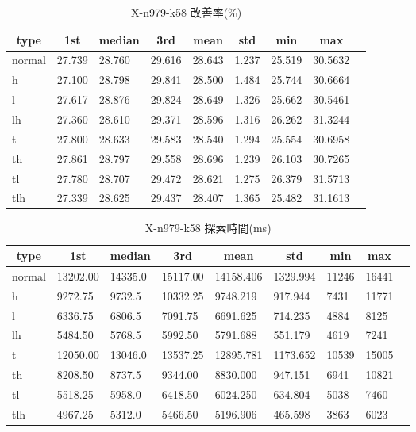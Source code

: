 \begin{table}[htbp]
    \caption{X-n979-k58 改善率(\%)}
    \begin{tabular}{|l|l|l|l|l|l|l|l|l|}\hline
    \multicolumn{1}{|c|}{\textbf{type}}
    &\multicolumn{1}{|c|}{\textbf{1st}}
    &\multicolumn{1}{c|}{\textbf{median}}
    &\multicolumn{1}{c|}{\textbf{3rd}}
    &\multicolumn{1}{c|}{\textbf{mean}}
    &\multicolumn{1}{c|}{\textbf{std}}
    &\multicolumn{1}{c|}{\textbf{min}}
    &\multicolumn{1}{c|}{\textbf{max}}\\\hline
	normal & 27.739 & 28.760 & 29.616 & 28.643 & 1.237 & 25.519 & 30.5632\\\hline
	h & 27.100 & 28.798 & 29.841 & 28.500 & 1.484 & 25.744 & 30.6664\\\hline
	l & 27.617 & 28.876 & 29.824 & 28.649 & 1.326 & 25.662 & 30.5461\\\hline
	lh & 27.360 & 28.610 & 29.371 & 28.596 & 1.316 & 26.262 & 31.3244\\\hline
	t & 27.800 & 28.633 & 29.583 & 28.540 & 1.294 & 25.554 & 30.6958\\\hline
	th & 27.861 & 28.797 & 29.558 & 28.696 & 1.239 & 26.103 & 30.7265\\\hline
	tl & 27.780 & 28.707 & 29.472 & 28.621 & 1.275 & 26.379 & 31.5713\\\hline
	tlh & 27.339 & 28.625 & 29.437 & 28.407 & 1.365 & 25.482 & 31.1613\\\hline
	\end{tabular}
\end{table}
\begin{table}[htbp]
    \caption{X-n979-k58 探索時間(ms)}
    \begin{tabular}{|l|l|l|l|l|l|l|l|l|}\hline
    \multicolumn{1}{|c|}{\textbf{type}}
    &\multicolumn{1}{|c|}{\textbf{1st}}
    &\multicolumn{1}{c|}{\textbf{median}}
    &\multicolumn{1}{c|}{\textbf{3rd}}
    &\multicolumn{1}{c|}{\textbf{mean}}
    &\multicolumn{1}{c|}{\textbf{std}}
    &\multicolumn{1}{c|}{\textbf{min}}
    &\multicolumn{1}{c|}{\textbf{max}}\\\hline
	normal & 13202.00 & 14335.0 & 15117.00 & 14158.406 & 1329.994 & 11246 & 16441\\\hline
	h & 9272.75 & 9732.5 & 10332.25 & 9748.219 & 917.944 & 7431 & 11771\\\hline
	l & 6336.75 & 6806.5 & 7091.75 & 6691.625 & 714.235 & 4884 & 8125\\\hline
	lh & 5484.50 & 5768.5 & 5992.50 & 5791.688 & 551.179 & 4619 & 7241\\\hline
	t & 12050.00 & 13046.0 & 13537.25 & 12895.781 & 1173.652 & 10539 & 15005\\\hline
	th & 8208.50 & 8737.5 & 9344.00 & 8830.000 & 947.151 & 6941 & 10821\\\hline
	tl & 5518.25 & 5958.0 & 6418.50 & 6024.250 & 634.804 & 5038 & 7460\\\hline
	tlh & 4967.25 & 5312.0 & 5466.50 & 5196.906 & 465.598 & 3863 & 6023\\\hline
	\end{tabular}
\end{table}
